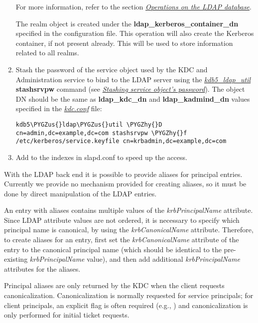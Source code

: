 \documentclass[letterpaper,10pt,english]{sphinxmanual}
\def\PYGZus{\char`\_}
\def\PYGZhy{\char`\-}
\begin{document}
\begin{enumerate}
For more information, refer to the section {\hyperref[admin/database:ops-on-ldap]{\emph{Operations on the LDAP database}}}.

The realm object is created under the
\textbf{ldap\_kerberos\_container\_dn} specified in the configuration file.
This operation will also create the Kerberos container, if not
present already.  This will be used to store information related to
all realms.

\item {} 
Stash the password of the service object used by the KDC and
Administration service to bind to the LDAP server using the
{\hyperref[admin/admin_commands/kdb5_ldap_util:kdb5-ldap-util-8]{\emph{kdb5\_ldap\_util}}} \textbf{stashsrvpw} command (see
{\hyperref[admin/database:stash-ldap]{\emph{Stashing service object's password}}}).  The object DN should be the same as
\textbf{ldap\_kdc\_dn} and \textbf{ldap\_kadmind\_dn} values specified in the
{\hyperref[admin/conf_files/kdc_conf:kdc-conf-5]{\emph{kdc.conf}}} file:

\begin{Verbatim}[commandchars=\\\{\}]
kdb5\PYGZus{}ldap\PYGZus{}util \PYGZhy{}D cn=admin,dc=example,dc=com stashsrvpw \PYGZhy{}f /etc/kerberos/service.keyfile cn=krbadmin,dc=example,dc=com
\end{Verbatim}

\item {} 
Add  to the indexes in slapd.conf to speed up
the access.

\end{enumerate}

With the LDAP back end it is possible to provide aliases for principal
entries.  Currently we provide no mechanism provided for creating
aliases, so it must be done by direct manipulation of the LDAP
entries.

An entry with aliases contains multiple values of the
\emph{krbPrincipalName} attribute.  Since LDAP attribute values are not
ordered, it is necessary to specify which principal name is canonical,
by using the \emph{krbCanonicalName} attribute.  Therefore, to create
aliases for an entry, first set the \emph{krbCanonicalName} attribute of
the entry to the canonical principal name (which should be identical
to the pre-existing \emph{krbPrincipalName} value), and then add additional
\emph{krbPrincipalName} attributes for the aliases.

Principal aliases are only returned by the KDC when the client
requests canonicalization.  Canonicalization is normally requested for
service principals; for client principals, an explicit flag is often
required (e.g., ) and canonicalization is only performed
for initial ticket requests.
\end{document}
